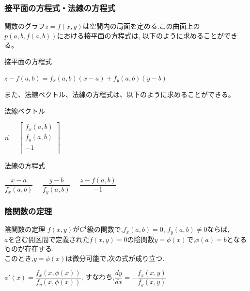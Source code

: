 \documentclass[a4paper]{jsarticle}
\begin{document}
\subsubsection{接平面の方程式・法線の方程式}
関数のグラフ$z=f\left(x,y\right)$は空間内の局面を定める.この曲面上の$p(a,b,f\left(a,b\right))$における接平面の方程式は,
以下のように求めることができる。
\begin{itembox}[l]{接平面の方程式}
    \begin{center}
        $z-f\left(a,b\right)=f_x\left(a,b\right)\left(x-a\right)+f_y\left(a,b\right)\left(y-b\right)$
    \end{center}
\end{itembox}
また、法線ベクトル、法線の方程式は、以下のように求めることができる。
\begin{itembox}[l]{法線ベクトル}
    \begin{center}
        $ \vec{n}=
            \begin{bmatrix}
                f_x\left(a,b\right) \\
                f_y\left(a,b\right) \\
                -1                  \\
            \end{bmatrix}
        $
    \end{center}
\end{itembox}
\begin{itembox}[l]{法線の方程式}
    \begin{center}
        $\dfrac{x-a}{f_x\left(a,b\right)}=\dfrac{y-b}{f_y\left(a,b\right)}=\dfrac{z-f\left(a,b\right)}{-1}$
    \end{center}
\end{itembox}
\subsubsection{陰関数の定理}
\begin{itembox}[l]{陰関数の定理}
    $f\left(x,y\right)$が$C^1$級の関数で,$f_x\left(a,b\right)=0$, $f_y\left(a,b\right)\neq0$ならば,\\
    $a$を含む開区間で定義された$f(x,y)=0$の陰関数$y=\phi\left(x\right)$で,$\phi\left(a\right)=b$となるものが存在する.\\
    このとき,$y=\phi\left(x\right)$は微分可能で,次の式が成り立つ.
    \begin{center}
        $\phi'\left(x\right)=\dfrac{f_x\left(x,\phi\left(x\right)\right)}{f_y\left(x,\phi\left(x\right)\right)}$,
        \quad すなわち,\quad$\dfrac{dy}{dx}=-\dfrac{f_x\left(x,y\right)}{f_y\left(x,y\right)}$
    \end{center}
\end{itembox}
\end{document}
